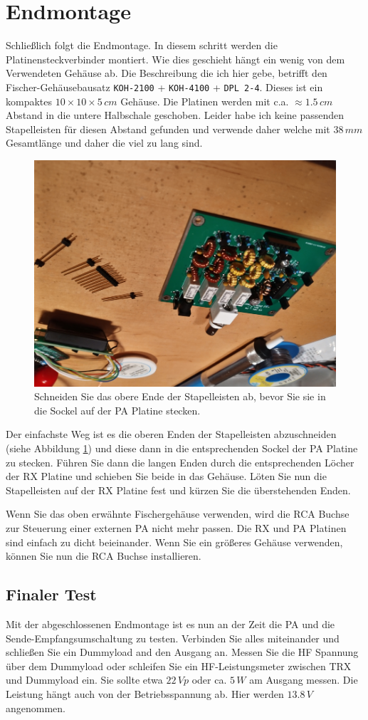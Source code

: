 \documentclass[10pt, a4paper,twoside]{scrartcl}
\begin{document}
\cleardoublepage
\section{Endmontage} \label{sec:box}
Schließlich folgt die Endmontage. In diesem schritt werden die Platinensteckverbinder montiert. Wie dies geschieht hängt ein wenig von dem Verwendeten Gehäuse ab. Die Beschreibung die ich hier gebe, betrifft den Fischer-Gehäusebausatz \texttt{KOH-2100} + \texttt{KOH-4100} + \texttt{DPL 2-4}. Dieses ist ein kompaktes $10 \times 10 \times 5\,cm$ Gehäuse. Die Platinen werden mit c.a. $\approx 1.5\,cm$ Abstand in die untere Halbschale geschoben. Leider habe ich keine passenden Stapelleisten für diesen Abstand gefunden und verwende daher welche mit $38\,mm$ Gesamtlänge und daher die viel zu lang sind.

\begin{figure}[!ht]
 \centering
 \includegraphics[width=0.3\linewidth]{fig/stackers_small.png}
 \caption{Schneiden Sie das obere Ende der Stapelleisten ab, bevor Sie sie in die Sockel auf der PA Platine stecken.} \label{fig:stackers}
\end{figure}

Der einfachste Weg ist es die oberen Enden der Stapelleisten abzuschneiden (siehe Abbildung \ref{fig:stackers}) und diese dann in die entsprechenden Sockel der PA Platine zu stecken. Führen Sie dann die langen Enden durch die entsprechenden Löcher der RX Platine und schieben Sie beide in das Gehäuse. Löten Sie nun die Stapelleisten auf der RX Platine fest und kürzen Sie die überstehenden Enden.

Wenn Sie das oben erwähnte Fischergehäuse verwenden, wird die RCA Buchse zur Steuerung einer externen PA nicht mehr passen. Die RX und PA Platinen sind einfach zu dicht beieinander. Wenn Sie ein größeres Gehäuse verwenden, können Sie nun die RCA Buchse installieren.


\subsection{Finaler Test}
Mit der abgeschlossenen Endmontage ist es nun an der Zeit die PA und die Sende-Empfangsumschaltung zu testen. Verbinden Sie alles miteinander und schließen Sie ein Dummyload and den Ausgang an. Messen Sie die HF Spannung über dem Dummyload oder schleifen Sie ein HF-Leistungsmeter zwischen TRX und Dummyload ein. Sie sollte etwa $22\,Vp$ oder ca. $5\,W$ am Ausgang messen. Die Leistung hängt auch von der Betriebsspannung ab. Hier werden $13.8\,V$ angenommen.
\end{document}
